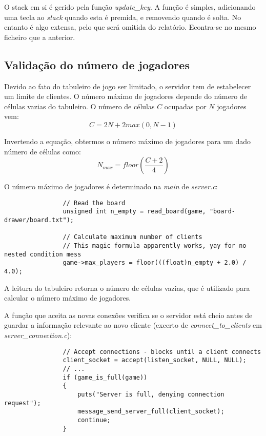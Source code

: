 \documentclass[a4paper]{report}
\begin{document}
            \par O stack em si é gerido pela função \textit{update\_key}. A função é simples, adicionando uma tecla ao \textit{stack} quando esta é premida, e removendo quando é solta. No entanto é algo extensa, pelo que será omitida do relatório. Econtra-se no mesmo ficheiro que a anterior.

        \subsection{Validação do número de jogadores}
            
            \par Devido ao fato do tabuleiro de jogo ser limitado, o servidor tem de estabelecer um limite de clientes. O número máximo de jogadores depende do número de células vazias do tabuleiro. O número de células \(C\) ocupadas por \(N\) jogadores vem:
            \begin{equation}
                C = 2N + 2 \textit{max}(0, N-1)
            \end{equation}
            \par Invertendo a equação, obtermos o número máximo de jogadores para um dado número de células como:
            \begin{equation}
                N_\textit{max} = \textit{floor}(\frac{C + 2}{4})
            \end{equation}

            \par O número máximo de jogadores é determinado na \textit{main} de \textit{server.c}:
            \begin{lstlisting}
                // Read the board
                unsigned int n_empty = read_board(game, "board-drawer/board.txt");

                // Calculate maximum number of clients
                // This magic formula apparently works, yay for no nested condition mess
                game->max_players = floor(((float)n_empty + 2.0) / 4.0);
            \end{lstlisting}
            \par A leitura do tabuleiro retorna o número de células vazias, que é utilizado para calcular o número máximo de jogadores. 
            \par A função que aceita as novas conexões verifica se o servidor está cheio antes de guardar a informação relevante ao novo cliente (excerto de \textit{connect\_to\_clients} em \textit{server\_connection.c}):
            \begin{lstlisting}
                // Accept connections - blocks until a client connects
                client_socket = accept(listen_socket, NULL, NULL);
                // ... 
                if (game_is_full(game))
                {
                    puts("Server is full, denying connection request");
                    message_send_server_full(client_socket);
                    continue;
                }
            \end{lstlisting}
\end{document}
